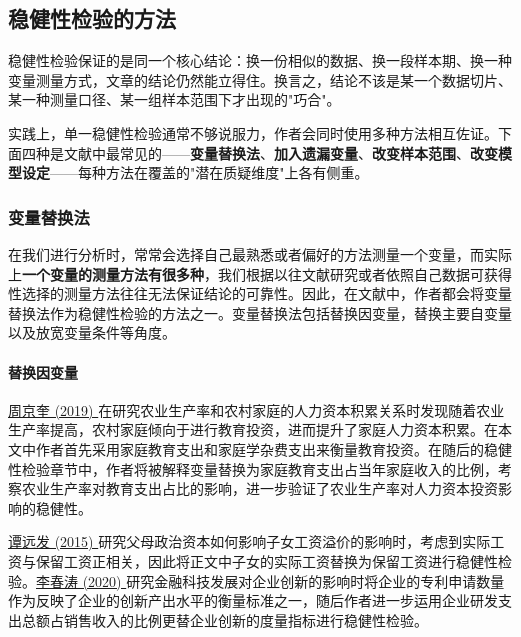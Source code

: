 \documentclass[11pt,a4paper]{ctexart}
\begin{document}
\subsection{稳健性检验的方法}

稳健性检验保证的是同一个核心结论：换一份相似的数据、换一段样本期、换一种变量测量方式，文章的结论仍然能立得住。换言之，结论不该是某一个数据切片、某一种测量口径、某一组样本范围下才出现的"巧合"。

实践上，单一稳健性检验通常不够说服力，作者会同时使用多种方法相互佐证。下面四种是文献中最常见的——\textbf{变量替换法}、\textbf{加入遗漏变量}、\textbf{改变样本范围}、\textbf{改变模型设定}——每种方法在覆盖的"潜在质疑维度"上各有侧重。

\subsubsection{变量替换法}

在我们进行分析时，常常会选择自己最熟悉或者偏好的方法测量一个变量，而实际上\textbf{一个变量的测量方法有很多种}，我们根据以往文献研究或者依照自己数据可获得性选择的测量方法往往无法保证结论的可靠性。因此，在文献中，作者都会将变量替换法作为稳健性检验的方法之一。变量替换法包括替换因变量，替换主要自变量以及放宽变量条件等角度。

\paragraph{替换因变量}

\href{https://xueshu.baidu.com/usercenter/paper/show?paperid=151n0g00nh720eg0m66y02h06a036701&site=xueshu_se}{周京奎
(2019)
}在研究农业生产率和农村家庭的人力资本积累关系时发现随着农业生产率提高，农村家庭倾向于进行教育投资，进而提升了家庭人力资本积累。在本文中作者首先采用家庭教育支出和家庭学杂费支出来衡量教育投资。在随后的稳健性检验章节中，作者将被解释变量替换为家庭教育支出占当年家庭收入的比例，考察农业生产率对教育支出占比的影响，进一步验证了农业生产率对人力资本投资影响的稳健性。

\href{https://xueshu.baidu.com/usercenter/paper/show?paperid=2eac551af04a42d6c5c90b181feeb395&site=xueshu_se&hitarticle=1}{谭远发
(2015)
}研究父母政治资本如何影响子女工资溢价的影响时，考虑到实际工资与保留工资正相关，因此将正文中子女的实际工资替换为保留工资进行稳健性检验。\href{https://xueshu.baidu.com/usercenter/paper/show?paperid=e116045880d5f16366d33f6da8e8dc66&site=xueshu_se}{李春涛
(2020)
}研究金融科技发展对企业创新的影响时将企业的专利申请数量作为反映了企业的创新产出水平的衡量标准之一，随后作者进一步运用企业研发支出总额占销售收入的比例更替企业创新的度量指标进行稳健性检验。
\end{document}
